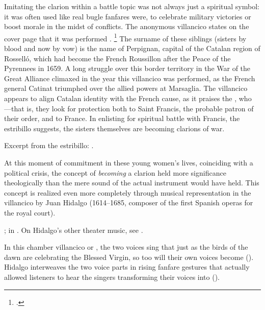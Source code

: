 Imitating the clarion within a battle topic was not always just a spiritual
symbol: it was often used like real bugle fanfares were, to celebrate military
victories or boost morale in the midst of conflicts.%
    \Autocite[288--294]{Illari:Polychoral}
The anonymous villancico  states on the cover
page that it was performed .%
    \footnote{.}
The surname of these siblings (sisters by blood and now by vow) is the name of
Perpignan, capital of the Catalan region of Rosselló, which had become the
French Roussillon after the Peace of the Pyrennees in 1659.
A long struggle over this border territory in the War of the Great Alliance
climaxed in the year this villancico was performed, as the French general
Catinat triumphed over the allied powers at Marsaglia.
The villancico appears to align Catalan identity with the French cause, as it
praises the , who
---that is,
they look for protection both to Saint Francis, the probable patron of their
order, and to France.
In enlisting for spiritual battle with Francis, the estribillo suggests, the
sisters themselves are becoming clarions of war.%
\begin{Footnote}
    Excerpt from the estribillo: 
    .
\end{Footnote}


At this moment of commitment in these young women's lives, coinciding with a
political crisis, the concept of \emph{becoming} a clarion held more
significance theologically than the mere sound of the actual instrument would
have held.
This concept is realized even more completely through musical representation in
the villancico  by Juan Hidalgo (1614--1685,
composer of the first Spanish operas for the royal court).%
\begin{Footnote}
    ; in \autocite[127--128]{Hidalgo:Tonos}.
    On Hidalgo's other theater music, see \autocite{Stein:Songs}.
\end{Footnote}
In this chamber villancico or , the two voices sing that just
as the birds of the dawn are  celebrating the Blessed Virgin, so
too will their own voices become 
().
Hidalgo interweaves the two voice parts in rising fanfare gestures that
actually allowed listeners to hear the singers transforming their voices into
 ().

